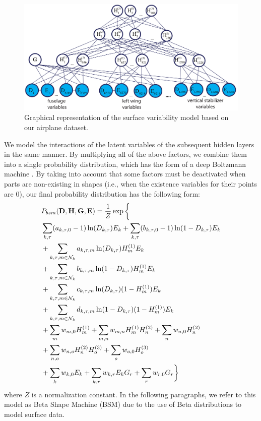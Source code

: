 \begin{figure}[t!]
\includegraphics[width=1.0\columnwidth]{figures/dbm}
\vskip -2mm
\caption{Graphical representation of the surface variability model based on our airplane dataset.}
\label{fig:graphical_model}
\vskip -8mm
\end{figure}


We model the interactions of the latent variables of the subsequent hidden layers in the same manner.  By multiplying all of the above factors, we combine them into a single probability distribution, which has the form of a deep Boltzmann machine \cite{Salakhutdinov12}. By taking into account that some factors must be deactivated when parts are non-existing in shapes (i.e., when the existence variables for their points are $0$), our final probability distribution has the following form: 
\begin{align}
& P_{bsm}( \mathbf{D}, \mathbf{H}, \mathbf{G}, \mathbf{E} ) = \frac{1}{Z} \exp \bigg\{ 
\nonumber  \\
& \sum\limits_{k,\tau} (a_{k,\tau,0}-1) \ln(D_{k,\tau})E_k + \sum\limits_{k,\tau} (b_{k,\tau,0}-1) \ln(1-D_{k,\tau})E_k 
\nonumber  \\
& +\sum\limits_{k,\tau,m \in \mathcal{N}_k} a_{k,\tau,m} \ln(D_{k,\tau}) H_m^{(1)}E_k 
\nonumber  \\
& +\sum\limits_{k,\tau,m \in \mathcal{N}_k} b_{k,\tau,m} \ln(1-D_{k,\tau}) H_m^{(1)}E_k
\nonumber  \\
& +\sum\limits_{k,\tau,m \in \mathcal{N}_k} c_{k,\tau,m} \ln(D_{k,\tau}) (1-H_m^{(1)})E_k 
\nonumber  \\
& +\sum\limits_{k,\tau,m \in \mathcal{N}_k} d_{k,\tau,m} \ln(1-D_{k,\tau}) (1-H_m^{(1)})E_k
\nonumber \\
& +\sum\limits_m w_{m, 0} H_m^{(1)} + \sum\limits_{m,n} w_{m, n} H_m^{(1)} H_n^{(2)} + \sum\limits_n w_{n,0}H_n^{(2)}
\nonumber \\
& + \sum\limits_{n,o} w_{n, o} H_n^{(2)} H_o^{(3)} + \sum\limits_o w_{o, 0} H_o^{(3)} 
\nonumber \\
& +\sum\limits_k w_{k,0} E_k + \sum\limits_{k,r} w_{k, r} E_k G_r + \sum\limits_r w_{r, 0}G_r \bigg\} 
\label{eq:BSM}
\end{align}
where $Z$ is a normalization constant. In the following paragraphs, we refer to this model as Beta Shape Machine (BSM) due to the use of Beta distributions to model  surface data.

